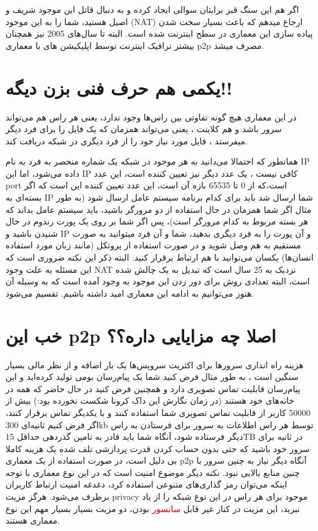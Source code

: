 \documentclass[]{article}
\begin{document}
اگر هم این سنگ قبر برایتان سوالی ایجاد کرده و به دنبال قاتل این موجود شریف و اصیل هستید، شما را به این موجود (NAT) ارجاع میدهم که باعث بسیار سخت شدن پیاده سازی این معماری در سطح اینترنت شده است. البته تا سال‌های 2005 نیز همچنان بیشتر ترافیک اینترنت توسط اپلیکیشن های با معماری p2p مصرف میشد.
 
 
\section*{{\titr یکمی هم حرف فنی بزن دیگه!!}}

در این معماری هیچ گونه تفاوتی بین راس‌ها وجود ندارد، یعنی هر راس هم می‌تواند سرور باشد و هم کلاینت ، یعنی می‌تواند همزمان که یک فایل را برای فرد دیگر میفرستد ، فایل مورد نیاز خود را از فرد دیگری در شبکه دریافت کند.

همانطور که احتمالا می‌دانید به هر موجود در شبکه یک شماره منحصر به فرد به نام IP داده می‌شود، اما این IP کافی نیست ، یک عدد دیگر نیز تعیین کننده است، این عدد port است،که از 0 تا 65535 بازه آن است، این عدد تعیین کننده این است که اگر بسته‌ای به IP شما ارسال شد باید برای کدام برنامه سیستم عامل ارسال شود (به طور مثال اگر شما همزمان در حال استفاده از دو مرورگر باشید، باید سیستم عامل بداند که هر بسته مربوط به کدام مرورگر است)، پس اگر شما بر روی یک پورت رندوم در حال شنیدن باشید و IP و آن پورت را به فرد دیگری بدهید‌، شما و آن فرد میتوانید به صورت مستقیم به هم وصل شوید و در صورت استفاده از پروتکل (مانند زبان مورد استفاده انسان‌ها) یکسان می‌توانید با هم ارتباط برقرار کنید.
البته ذکر این نکته ضروری است که این مسئله به علت وجود NAT نزدیک به 25 سال است که تبدیل به یک چالش شده است، البته تعدادی روش برای دور زدن این موجود  به وجود آمده است که به وسیله آن هنوز می‌توانیم به ادامه این معماری امید داشته باشیم.
   تقسیم می‌شود.


\newpage
\section*{{\titr خب این p2p اصلا چه مزایایی داره؟؟}}


هزینه راه اندازی سرور‌ها برای اکثریت سرویس‌ها یک بار اضافه و از نظر مالی بسیار سنگین است ، به طور مثال فرض کنید شما یک پیام‌رسان بومی تولید کرده‌اید و این پیام‌رسان قابلیت تماس تصویری دارد و همچنین فرض کنید در حال حاضر که همه در خانه‌های خود هستند (در زمان نگارش این داک کرونا شکست نخورده بود:) بیش از 50000 کاربر از قابلیت تماس تصویری شما استفاده کنند و با یکدیگر تماس برقرار کنند، اگر فرض کنیم ثانیه‌ای 300kb توسط هر راس اطلاعات به سرور برای فرستادن به راس دیگر فرستاده شود‌، آنگاه شما باید قادر به تامین گذردهی حداقل 15TB در ثانیه برای سرور خود باشید که حتی بدون حساب کردن قدرت پردازشی تلف شده یک هزینه کاملا بی دلیل است، در صورت استفاده از یک معماری p2p آنگاه دیگر نیاز به چنین سرور با چنین منابع بالایی نبود. نکته دیگر موضوع امنیت است که در این نوع معماری با توجه اینکه می‌توان رمز گذاری‌های متنوعی استفاده کرد، دغدغه امنیت ارتباط کاربران برطرف می‌شود. 
هرگز مزیت privacy موجود برای هر راس در این نوع شبکه را از یاد نبرید، این مزیت در کنار غیر قابل \textcolor{red}{سانسور} بودن‌، دو مزیت بسیار بسیار مهم این نوع معماری هستند.
\end{document}
